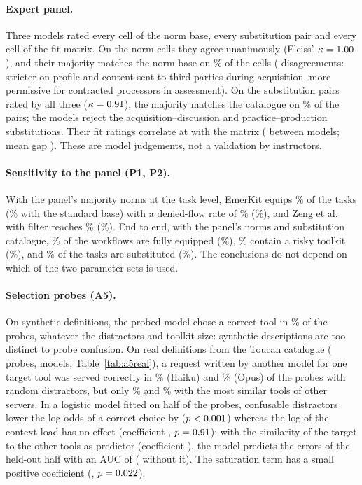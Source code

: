 \documentclass[10pt]{article}
\begin{document}
\paragraph{Expert panel.} Three models rated every cell of the norm base, every substitution pair and every cell of the fit matrix. On the \RJnItems{} norm cells they agree unanimously (Fleiss' $\kappa=1.00$), and their majority matches the norm base on \RJnAgree\% of the cells (\RJnDis{} disagreements: stricter on profile and content sent to third parties during acquisition, more permissive for contracted processors in assessment). On the \RJsItems{} substitution pairs rated by all three ($\kappa=0.91$), the majority matches the catalogue on \RJsAgree\% of the pairs; the models reject the acquisition--discussion and practice--production substitutions. Their fit ratings correlate at \RJfCorr{} with the matrix (\RJfInter{} between models; mean gap \RJfGap). These are model judgements, not a validation by instructors.

\paragraph{Sensitivity to the panel (P1, P2).} With the panel's majority norms at the task level, EmerKit equips \RPonePanelEq\% of the tasks (\RPoneStandardEq\% with the standard base) with a denied-flow rate of \RPonePanelDfr\% (\RPoneStandardDfr\%), and Zeng et al. with filter reaches \RPonePanelZfDfr\% (\RPoneStandardZfDfr\%). End to end, with the panel's norms and substitution catalogue, \RPtwoPanelAll\% of the workflows are fully equipped (\RPtwoStandardAll\%), \RPtwoPanelRisk\% contain a risky toolkit (\RPtwoStandardRisk\%), and \RPtwoPanelSub\% of the tasks are substituted (\RPtwoStandardSub\%). The conclusions do not depend on which of the two parameter sets is used.

\paragraph{Selection probes (A5).} On synthetic definitions, the probed model chose a correct tool in \RAfiveSyn\% of the probes, whatever the distractors and toolkit size: synthetic descriptions are too distinct to probe confusion. On real definitions from the Toucan catalogue (\RAfiveN{} probes, \RAfiveModels{} models, Table~\ref{tab:a5real}), a request written by another model for one target tool was served correctly in \RAfiveHaikuRand\% (Haiku) and \RAfiveOpusRand\% (Opus) of the probes with random distractors, but only \RAfiveHaikuConf\% and \RAfiveOpusConf\% with the most similar tools of other servers. In a logistic model fitted on half of the probes, confusable distractors lower the log-odds of a correct choice by \RAfiveCoefConf{} ($p < 0.001$) whereas the log of the context load has no effect (coefficient \RAfiveCoefLoad, $p=0.91$); with the similarity of the target to the other tools as predictor (coefficient \RAfiveCoefSim), the model predicts the errors of the held-out half with an AUC of \RAfiveAucSim{} (\RAfiveAucBase{} without it). The saturation term has a small positive coefficient (\RAfiveCoefSat, $p=0.022$).
\end{document}
